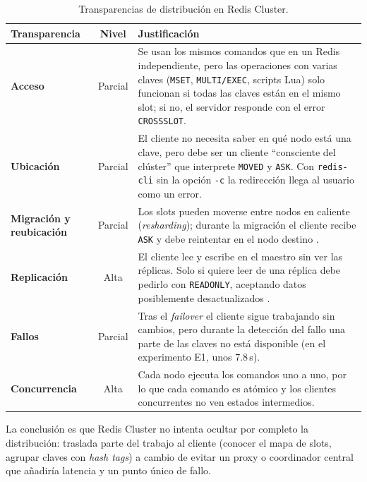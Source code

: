 \documentclass[11pt,a4paper]{article}
\begin{document}
\begin{table}[H]
  \centering
  \caption{Transparencias de distribución en Redis Cluster.}
  \label{tab:transparencias}
  \small
  \begin{tabularx}{\linewidth}{>{\bfseries}l c X}
    \toprule
    \textbf{Transparencia} & \textbf{Nivel} & \textbf{Justificación} \\
    \midrule
    Acceso & Parcial &
      Se usan los mismos comandos que en un Redis independiente, pero las
      operaciones con varias claves (\texttt{MSET}, \texttt{MULTI/EXEC},
      scripts Lua) solo funcionan si todas las claves están en el mismo slot;
      si no, el servidor responde con el error \texttt{CROSSSLOT}. \\
    Ubicación & Parcial &
      El cliente no necesita saber en qué nodo está una clave, pero debe ser
      un cliente ``consciente del clúster'' que interprete \texttt{MOVED} y
      \texttt{ASK}. Con \texttt{redis-cli} sin la opción \texttt{-c} la
      redirección llega al usuario como un error. \\
    Migración y reubicación & Parcial &
      Los slots pueden moverse entre nodos en caliente (\emph{resharding});
      durante la migración el cliente recibe \texttt{ASK} y debe reintentar
      en el nodo destino \cite{redis2026scaling}. \\
    Replicación & Alta &
      El cliente lee y escribe en el maestro sin ver las réplicas. Solo si
      quiere leer de una réplica debe pedirlo con \texttt{READONLY},
      aceptando datos posiblemente desactualizados \cite{redis2026replication}. \\
    Fallos & Parcial &
      Tras el \emph{failover} el cliente sigue trabajando sin cambios, pero
      durante la detección del fallo una parte de las claves no está
      disponible (en el experimento E1, unos 7.8\,s). \\
    Concurrencia & Alta &
      Cada nodo ejecuta los comandos uno a uno, por lo que cada comando es
      atómico y los clientes concurrentes no ven estados intermedios. \\
    \bottomrule
  \end{tabularx}
\end{table}

La conclusión es que Redis Cluster no intenta ocultar por completo la
distribución: traslada parte del trabajo al cliente (conocer el mapa de
slots, agrupar claves con \emph{hash tags}) a cambio de evitar un proxy o
coordinador central que añadiría latencia y un punto único de fallo.
\end{document}

